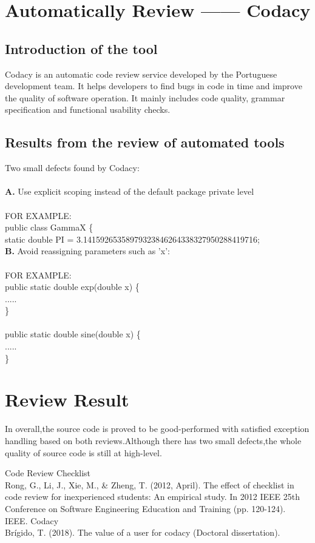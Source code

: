 \documentclass[12pt,letterpaper]{article}
\begin{document}
\clearpage
{}

\section{Automatically Review ------ Codacy}
\subsection{Introduction of the tool}
Codacy is an automatic code review service developed by the Portuguese development team. It helps developers to find bugs in code in time and improve the quality of software operation. It mainly includes code quality, grammar specification and functional usability checks.
\subsection{Results from the review of automated tools}
Two small defects found by Codacy:\\
\\
 \textbf{A.}  Use explicit scoping instead of the default package private level\\
 \\
FOR EXAMPLE:\\
public class GammaX \{\\
static double PI = 3.14159265358979323846264338327950288419716;\\

 \textbf{B.} Avoid reassigning parameters such as 'x':\\
 \\
 FOR EXAMPLE:\\
 public static double exp(double x) \{\\
 .....\\
 \}\\
 \\
 public static double sine(double x) \{\\
 .....\\
  \}
\section{Review Result}
In overall,the source code is proved to be good-performed with satisfied exception handling based on both reviews.Although there has two small defects,the whole quality of source code is still at high-level.

\begin{thebibliography}{3}
Code Review Checklist\\
{Rong, G., Li, J., Xie, M., & Zheng, T. (2012, April). The effect of checklist in code review for inexperienced students: An empirical study. In 2012 IEEE 25th Conference on Software Engineering Education and Training (pp. 120-124). IEEE.}
Codacy\\
{Brígido, T. (2018). The value of a user for codacy (Doctoral dissertation).}
\end{thebibliography}
\end{document}
